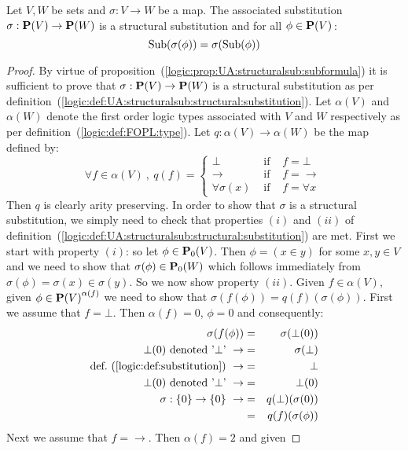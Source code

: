 \begin{prop}\label{logic:prop:FOPL:substitution:subformula}
Let $V,W$ be sets and $\sigma:V\to W$ be a map. The associated
substitution $\sigma:\mbox{${\bf P}(V)$}\to{\bf P}(W)$ is a structural substitution
and for all $\phi\in\mbox{${\bf P}(V)$}$\,:
    \[
    \mbox{\rm Sub}(\sigma(\phi))=\sigma(\mbox{\rm Sub}(\phi))
    \]
\end{prop}
\begin{proof}
By virtue of
proposition~(\ref{logic:prop:UA:structuralsub:subformula}) it is
sufficient to prove that $\sigma:\mbox{${\bf P}(V)$}\to{\bf P}(W)$ is a structural
substitution as per
definition~(\ref{logic:def:UA:structuralsub:structural:substitution}).
Let $\alpha(V)$ and $\alpha(W)$ denote the first order logic types
associated with $V$ and $W$ respectively as per
definition~(\ref{logic:def:FOPL:type}). Let
$q:\alpha(V)\to\alpha(W)$ be the map defined by:
    \[
    \forall f\in\alpha(V)\ ,\ q(f)=\left\{
        \begin{array}{lcl}
        \bot&\mbox{\ if\ }&f=\bot\\
        \to&\mbox{\ if\ }&f=\to\\
        \forall\sigma(x)&\mbox{\ if\ }&f=\forall x
        \end{array}
    \right.
    \]
Then $q$ is clearly arity preserving. In order to show that $\sigma$
is a structural substitution, we simply need to check that
properties $(i)$ and $(ii)$ of
definition~(\ref{logic:def:UA:structuralsub:structural:substitution})
are met. First we start with property $(i)$: so let $\phi\in\mbox{${\bf P}_{0}(V)$}$.
Then $\phi=(x\in y)$ for some $x,y\in V$ and we need to show that
$\sigma(\phi)\in{\bf P}_{0}(W)$ which follows immediately from
$\sigma(\phi)=\sigma(x)\in\sigma(y)$. So we now show property
$(ii)$. Given $f\in\alpha(V)$, given $\phi\in\mbox{${\bf P}(V)$}^{\alpha(f)}$ we
need to show that $\sigma(f(\phi))=q(f)(\sigma(\phi))$. First we
assume that $f=\bot$. Then $\alpha(f)=0$, $\phi=0$ and consequently:
    \begin{eqnarray*}
    \sigma(f(\phi))&=&\sigma(\bot(0))\\
    \mbox{$\bot(0)$ denoted '$\bot$'}\ \rightarrow&=&\sigma(\bot)\\
    \mbox{def.~(\ref{logic:def:substitution})}\ \rightarrow&=&\bot\\
    \mbox{$\bot(0)$ denoted '$\bot$'}\ \rightarrow&=&\bot(0)\\
    \sigma:\{0\}\to\{0\}\ \rightarrow&=&q(\bot)(\sigma(0))\\
    &=&q(f)(\sigma(\phi))
    \end{eqnarray*}
Next we assume that $f=\to$. Then $\alpha(f)=2$ and given

\end{proof}
